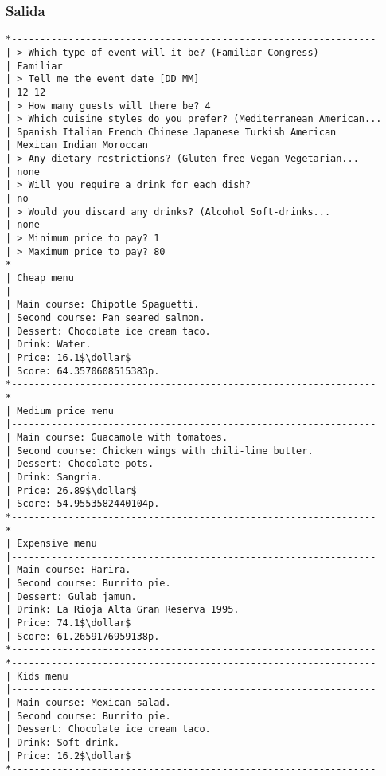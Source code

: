 \documentclass{article}
\newcommand{\dollar}{\mbox{\textdollar}}
\begin{document}
\subsubsection{Salida}
\begin{lstlisting}
*----------------------------------------------------------------
| > Which type of event will it be? (Familiar Congress)
| Familiar
| > Tell me the event date [DD MM]
| 12 12
| > How many guests will there be? 4
| > Which cuisine styles do you prefer? (Mediterranean American...
| Spanish Italian French Chinese Japanese Turkish American
| Mexican Indian Moroccan
| > Any dietary restrictions? (Gluten-free Vegan Vegetarian...
| none
| > Will you require a drink for each dish?
| no
| > Would you discard any drinks? (Alcohol Soft-drinks...
| none
| > Minimum price to pay? 1
| > Maximum price to pay? 80
*----------------------------------------------------------------
| Cheap menu
|----------------------------------------------------------------
| Main course: Chipotle Spaguetti.
| Second course: Pan seared salmon.
| Dessert: Chocolate ice cream taco.
| Drink: Water.
| Price: 16.1$\dollar$
| Score: 64.3570608515383p.
*----------------------------------------------------------------
*----------------------------------------------------------------
| Medium price menu
|----------------------------------------------------------------
| Main course: Guacamole with tomatoes.
| Second course: Chicken wings with chili-lime butter.
| Dessert: Chocolate pots.
| Drink: Sangria.
| Price: 26.89$\dollar$
| Score: 54.9553582440104p.
*----------------------------------------------------------------
*----------------------------------------------------------------
| Expensive menu
|----------------------------------------------------------------
| Main course: Harira.
| Second course: Burrito pie.
| Dessert: Gulab jamun.
| Drink: La Rioja Alta Gran Reserva 1995.
| Price: 74.1$\dollar$
| Score: 61.2659176959138p.
*----------------------------------------------------------------
*----------------------------------------------------------------
| Kids menu
|----------------------------------------------------------------
| Main course: Mexican salad.
| Second course: Burrito pie.
| Dessert: Chocolate ice cream taco.
| Drink: Soft drink.
| Price: 16.2$\dollar$
*----------------------------------------------------------------
\end{lstlisting}
\end{document}
